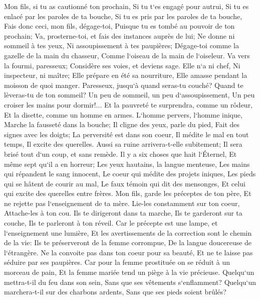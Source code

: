 \verse Mon fils, si tu as cautionné ton prochain, Si tu t`es engagé pour autrui, 
\verse Si tu es enlacé par les paroles de ta bouche, Si tu es pris par les paroles de ta bouche, 
\verse Fais donc ceci, mon fils, dégage-toi, Puisque tu es tombé au pouvoir de ton prochain; Va, prosterne-toi, et fais des instances auprès de lui; 
\verse Ne donne ni sommeil à tes yeux, Ni assoupissement à tes paupières; 
\verse Dégage-toi comme la gazelle de la main du chasseur, Comme l`oiseau de la main de l`oiseleur. 
\verse Va vers la fourmi, paresseux; Considère ses voies, et deviens sage. 
\verse Elle n`a ni chef, Ni inspecteur, ni maître; 
\verse Elle prépare en été sa nourriture, Elle amasse pendant la moisson de quoi manger. 
\verse Paresseux, jusqu`à quand seras-tu couché? Quand te lèveras-tu de ton sommeil? 
\verse Un peu de sommeil, un peu d`assoupissement, Un peu croiser les mains pour dormir!... 
\verse Et la pauvreté te surprendra, comme un rôdeur, Et la disette, comme un homme en armes. 
\verse L`homme pervers, l`homme inique, Marche la fausseté dans la bouche; 
\verse Il cligne des yeux, parle du pied, Fait des signes avec les doigts; 
\verse La perversité est dans son coeur, Il médite le mal en tout temps, Il excite des querelles. 
\verse Aussi sa ruine arrivera-t-elle subitement; Il sera brisé tout d`un coup, et sans remède. 
\verse Il y a six choses que hait l`Éternel, Et même sept qu`il a en horreur; 
\verse Les yeux hautains, la langue menteuse, Les mains qui répandent le sang innocent, 
\verse Le coeur qui médite des projets iniques, Les pieds qui se hâtent de courir au mal, 
\verse Le faux témoin qui dit des mensonges, Et celui qui excite des querelles entre frères. 
\verse Mon fils, garde les préceptes de ton père, Et ne rejette pas l`enseignement de ta mère. 
\verse Lie-les constamment sur ton coeur, Attache-les à ton cou. 
\verse Ils te dirigeront dans ta marche, Ils te garderont sur ta couche, Ils te parleront à ton réveil. 
\verse Car le précepte est une lampe, et l`enseignement une lumière, Et les avertissements de la correction sont le chemin de la vie: 
\verse Ils te préserveront de la femme corrompue, De la langue doucereuse de l`étrangère. 
\verse Ne la convoite pas dans ton coeur pour sa beauté, Et ne te laisse pas séduire par ses paupières. 
\verse Car pour la femme prostituée on se réduit à un morceau de pain, Et la femme mariée tend un piège à la vie précieuse. 
\verse Quelqu`un mettra-t-il du feu dans son sein, Sans que ses vêtements s`enflamment? 
\verse Quelqu`un marchera-t-il sur des charbons ardents, Sans que ses pieds soient brûlés? 
